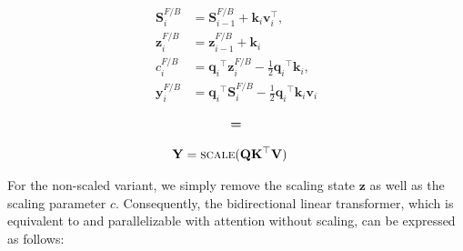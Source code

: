 \begin{minipage}[t]{0.45\textwidth}
\begin{whitebox}
    \begin{align}
        \mathbf{S}^{F/B}_i &= \mathbf{S}^{F/B}_{i-1} + \mathbf{k}_i \mathbf{v}_i^{\top}, \\
    \mathbf{z}^{F/B}_i & =  \mathbf{z}^{F/B}_{i-1} +  \mathbf{k}_i \\
    c^{F/B}_i & =  {{{\mathbf{q}_i}}^{\top} \mathbf{z}^{F/B}_{i}} - \frac{1}{2}{{\mathbf{q}_i}}^{\top} \mathbf{k}_i, \\
    \mathbf{y}^{F/B}_i &= {{{\mathbf{q}_i}}^{\top} \mathbf{S}^{F/B}_i}  - \frac{1}{2}{{\mathbf{q}_i}}^{\top} \mathbf{k}_i \mathbf{v}_i 
    \end{align}
\end{whitebox}
\end{minipage}
\begin{minipage}[t]{0.1\textwidth}
\vspace{-2.3cm}
    \begin{align}
       \textbf{=} \notag
    \end{align}
\end{minipage}
\begin{minipage}[t]{0.4\textwidth}
\vspace{-2.3cm}
\begin{whitebox}
    \begin{align}
        \mathbf{Y} &= \textsc{scale}(\mathbf{Q}\mathbf{K}^{\top}\mathbf{V})
    \end{align}
\end{whitebox}
\end{minipage}

For the non-scaled variant, we simply remove the scaling state \(\mathbf{z}\) as well as the scaling parameter \(c\). Consequently, the bidirectional linear transformer, which is equivalent to and parallelizable with attention without scaling, can be expressed as follows:

